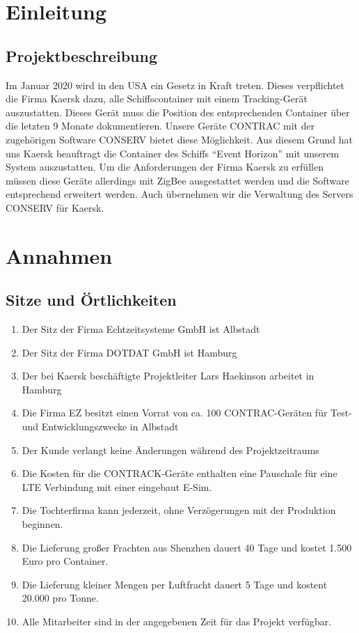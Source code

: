 

\section{Einleitung}
\subsection{Projektbeschreibung}
Im Januar 2020 wird in den USA ein Gesetz in Kraft treten. Dieses verpflichtet die Firma Kaersk dazu, alle Schiffscontainer mit einem Tracking-Gerät auszustatten. Dieses Gerät muss die Position des entsprechenden Container über die letzten 9 Monate dokumentieren. Unsere Geräte CONTRAC mit der zugehörigen Software CONSERV bietet diese Möglichkeit. Aus diesem Grund hat uns Kaersk beauftragt die Container des Schiffs "`Event Horizon"' mit unserem System auszustatten. Um die Anforderungen der Firma Kaersk zu erfüllen müssen diese Geräte allerdings mit ZigBee ausgestattet werden und die Software entsprechend erweitert werden. Auch übernehmen wir die Verwaltung des Servers CONSERV für Kaersk.
\section{Annahmen}
\subsection{Sitze und Örtlichkeiten}
\begin{enumerate}
    \item Der Sitz der Firma Echtzeitsysteme GmbH ist Albstadt
    \item Der Sitz der Firma DOTDAT GmbH ist Hamburg
    \item Der bei Kaersk beschäftigte Projektleiter Lars Haekinson arbeitet in Hamburg
    \item Die Firma EZ besitzt einen Vorrat von ca. 100 CONTRAC-Geräten für Test- und Entwicklungszwecke in Albstadt
    \item Der Kunde verlangt keine Änderungen während des Projektzeitraums
   
    \item Die Kosten für die CONTRACK-Geräte enthalten eine Pauschale für eine LTE Verbindung mit einer eingebaut E-Sim.
	\item Die Tochterfirma kann jederzeit, ohne Verzögerungen mit der Produktion beginnen.
    \item Die Lieferung großer Frachten aus Shenzhen dauert 40 Tage und kostet 1.500 Euro pro Container.
    \item Die Lieferung kleiner Mengen per Luftfracht dauert 5 Tage und kostent 20.000 pro Tonne.
    \item Alle Mitarbeiter sind in der angegebenen Zeit für das Projekt verfügbar.
\end{enumerate}


